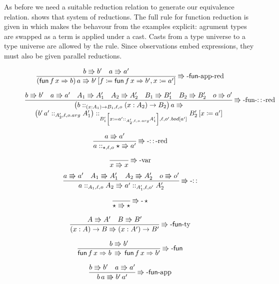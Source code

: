 As before we need a suitable reduction relation to generate our equivalence relation.
 shows that system of reductions.
The full rule for function reduction is given in  which makes the behavour from the examples explicit: agrument types are swapped as a term is applied under a cast.
Casts from a type universe to a type universe are allowed by the  rule.
Since observations embed expressions, they must also be given parallel reductions.

\begin{figure}
\[
\frac{b\Rrightarrow b'\quad a\Rrightarrow a'}{\left(\mathsf{fun}\,f\,x\Rightarrow b\right)a\Rrightarrow b'\left[f\coloneqq\mathsf{fun}\,f\,x\Rightarrow b',x\coloneqq a'\right]}
\operatorname{\Rrightarrow-\mathsf{fun}-app-red}
\]

\[
\frac{b\Rrightarrow b'\quad a\Rrightarrow a'\quad A_{1}\Rrightarrow A_{1}'\quad A_{2}\Rrightarrow A_{2}'\quad B_{1}\Rrightarrow B_{1}'\quad B_{2}\Rrightarrow B_{2}'\quad o\Rrightarrow o'}{\begin{array}{c}
\left(b::_{\left(x:A_{1}\right)\rightarrow B_{1},\ell ,o}\left(x:A_{2}\right)\rightarrow B_{2}\right)a\Rrightarrow\\
\left(b'\,a'::_{A_{2}',\ell,o.arg}A_{1}'\right)::_{B_{1}'\left[x\coloneqq a'::_{A_{2}',\ell,o.arg}A_{1}'\right],\ell ,o'.bod[a']}B_{2}'\left[x\coloneqq a'\right]
\end{array}}
\operatorname{\Rrightarrow-fun-::-red}
\]

\[
\frac{a\Rrightarrow a'}{a::_{\star,\ell,o}\star\Rrightarrow a'}
\operatorname{\Rrightarrow-::-red}
\]

\[
\frac{\,}{x\Rrightarrow x}
\operatorname{\Rrightarrow-var}
\]
\[
\frac{a\Rrightarrow a'\quad A_{1}\Rrightarrow A_{1}'\quad A_{2}\Rrightarrow A_{2}'\quad o\Rrightarrow o'}{a::_{A_{1},\ell ,o}A_{2}\Rrightarrow a'::_{A_{1}',\ell ,o'}A_{2}'}
\operatorname{\Rrightarrow-::}
\]

\[
\frac{\,}{\star\Rrightarrow\star}
\operatorname{\Rrightarrow-}\star
\]

\[
\frac{A\Rrightarrow A'\quad B\Rrightarrow B'}{\left(x:A\right)\rightarrow B\Rrightarrow\left(x:A'\right)\rightarrow B'}
\operatorname{\Rrightarrow-\mathsf{fun}-ty}
\]

\[
\frac{b\Rrightarrow b'}{\mathsf{fun}\,f\,x\Rightarrow b\,\Rrightarrow\,\mathsf{fun}\,f\,x\Rightarrow b'}
\operatorname{\Rrightarrow-\mathsf{fun}}
\]

\[
\frac{b\Rrightarrow b'\quad a\Rrightarrow a'}{b\,a\Rrightarrow b'\,a'}
\operatorname{\Rrightarrow-\mathsf{fun}-app}
\]


\end{figure}
